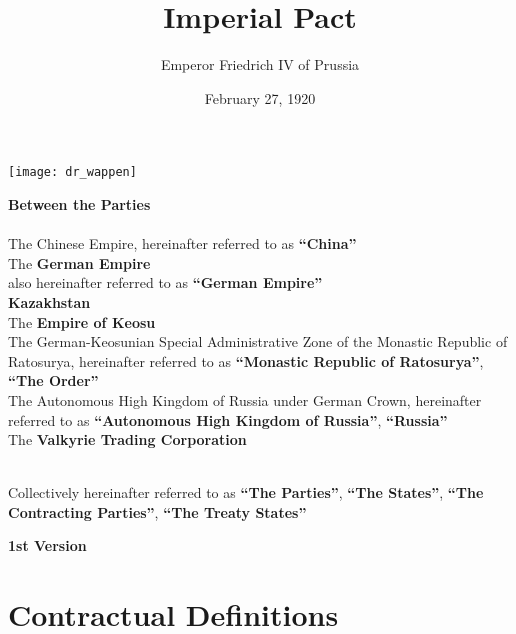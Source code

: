 \documentclass{article}
\title{Imperial Pact}
\author{Emperor Friedrich IV of Prussia}
\date{February 27, 1920}
\begin{document}
\maketitle
\begin{center}
    \texttt{[image: dr\_wappen]}
\end{center}
\begin{center}
    \textbf{Between the Parties\\}\textbf{\\}
    The Chinese Empire, hereinafter referred to as \textbf{``China''\\}
    The \textbf{German Empire\\} also hereinafter referred to as \textbf{``German Empire''\\}
    \textbf{Kazakhstan\\}
    The \textbf{Empire of Keosu\\}
    The German-Keosunian Special Administrative Zone of the Monastic Republic of Ratosurya, hereinafter referred to as \textbf{``Monastic Republic of Ratosurya''}, \textbf{``The Order''\\}
    The Autonomous High Kingdom of Russia under German Crown, hereinafter referred to as \textbf{``Autonomous High Kingdom of Russia''}, \textbf{``Russia''\\}
    The \textbf{Valkyrie Trading Corporation\\}
    \textbf{\\}

    Collectively hereinafter referred to as \textbf{``The Parties''}, \textbf{``The States''}, \textbf{``The Contracting Parties''}, \textbf{``The Treaty States''}
\end{center}
\newpage
{}
\vspace*{\fill}
\begin{Center}
\textbf{1st Version}
\vspace*{\fill}
\end{Center}
\newpage
\tableofcontents
\newpage
\section{Contractual Definitions}
\end{document}
